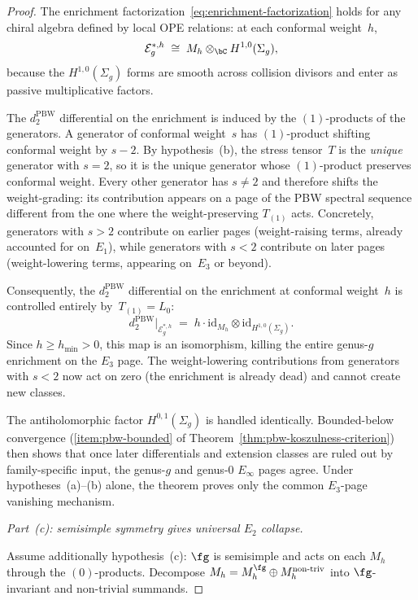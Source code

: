 \begin{proof}
The enrichment factorization~\eqref{eq:enrichment-factorization}
holds for any chiral algebra defined by local OPE relations:
at each conformal weight~$h$,
\[
\mathcal{E}_g^{*,h}
\;\cong\; M_h \otimes_{\bC} H^{1,0}(\Sigma_g),
\]
because the $H^{1,0}(\Sigma_g)$ forms are smooth across
collision divisors and enter as passive multiplicative factors.

The $d_2^{\mathrm{PBW}}$ differential on the enrichment is
induced by the $(1)$-products of the generators.  A generator
of conformal weight~$s$ has $(1)$-product shifting conformal
weight by $s - 2$.  By hypothesis~(b), the stress tensor~$T$
is the \emph{unique} generator with $s = 2$, so it is the
unique generator whose $(1)$-product preserves conformal weight.
Every other generator has $s \neq 2$ and therefore shifts the
weight-grading: its contribution appears on a page of the PBW
spectral sequence different from the one where the
weight-preserving $T_{(1)}$ acts.  Concretely, generators with
$s > 2$ contribute on earlier pages (weight-raising terms,
already accounted for on~$E_1$), while generators with $s < 2$
contribute on later pages (weight-lowering terms, appearing
on~$E_3$ or beyond).

Consequently, the $d_2^{\mathrm{PBW}}$ differential on the
enrichment at conformal weight~$h$ is controlled entirely
by~$T_{(1)} = L_0$:
\[
d_2^{\mathrm{PBW}}\big|_{\mathcal{E}_g^{*,h}}
\;=\;
h \cdot \mathrm{id}_{M_h}
\otimes
\mathrm{id}_{H^{1,0}(\Sigma_g)}.
\]
Since $h \geq h_{\min} > 0$, this map is an isomorphism,
killing the entire genus-$g$ enrichment on the $E_3$ page.
The weight-lowering contributions from generators with $s < 2$
now act on zero (the enrichment is already dead) and cannot
create new classes.

The antiholomorphic factor $H^{0,1}(\Sigma_g)$ is handled
identically.  Bounded-below convergence
\textup{(}\ref{item:pbw-bounded} of
Theorem~\ref{thm:pbw-koszulness-criterion}\textup{)}
then shows that once later differentials and extension classes are
ruled out by family-specific input, the genus-$g$ and genus-$0$
$E_\infty$ pages agree.  Under hypotheses~(a)--(b) alone, the
theorem proves only the common $E_3$-page vanishing mechanism.

\medskip
\emph{Part~\textup{(c)}: semisimple symmetry gives universal
$E_2$ collapse.}

Assume additionally hypothesis~(c): $\fg$ is semisimple
and acts on each $M_h$ through the $(0)$-products.
Decompose $M_h = M_h^{\fg} \oplus M_h^{\mathrm{non\text{-}triv}}$
into $\fg$-invariant and non-trivial summands.


\end{proof}
